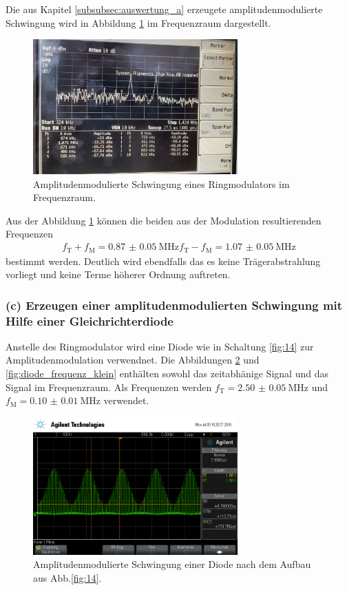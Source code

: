 Die aus Kapitel \ref{subsubsec:auswertung_a} erzeugete
amplitudenmodulierte Schwingung wird in Abbildung \ref{fig:ringamp_frequenz}
im Frequenzraum dargestellt.
\begin{figure}
  \centering
  \includegraphics[width=0.7\textwidth]{spec/frequenzbereich_klein_ring.jpg}
  \caption{Amplitudenmodulierte
  Schwingung eines Ringmodulators im Frequenzraum.}
  \label{fig:ringamp_frequenz}
\end{figure}
Aus der Abbildung \ref{fig:ringamp_frequenz}
können die beiden aus der Modulation resultierenden Frequenzen
\begin{align}
  f_{\text{T}}+f_{\text{M}}=\SI{0.87(5)}{\mega\hertz}
  f_{\text{T}}-f_{\text{M}}=\SI{1.07(5)}{\mega\hertz}
\end{align}
bestimmt werden.
Deutlich wird ebendfalls das es keine Trägerabstrahlung vorliegt und
keine Terme höherer Ordnung auftreten.

\subsubsection{(c) Erzeugen einer amplitudenmodulierten Schwingung
mit Hilfe einer Gleichrichterdiode}
\label{subsubsec:auswertung_c}
Anstelle des Ringmodulator wird eine Diode wie in Schaltung \ref{fig:14} zur Amplitudenmodulation verwendnet.
Die Abbildungen \ref{fig:diode_zeit} und \ref{fig:diode_frequenz_klein}
enthälten
sowohl das zeitabhänige Signal und das Signal im Frequenzraum.
Als Frequenzen werden $f_{\text{T}}=\SI{2.50(5)}{\mega\hertz}$ und
$f_{\text{M}}=\SI{0.10(1)}{\mega\hertz}$ verwendet.
\begin{figure}
  \centering
  \includegraphics[width=0.7\textwidth]{osci/amp_mod_diode.png}
  \caption{Amplitudenmodulierte
  Schwingung einer Diode nach dem Aufbau aus Abb.\ref{fig:14}.}
  \label{fig:diode_zeit}
\end{figure}

